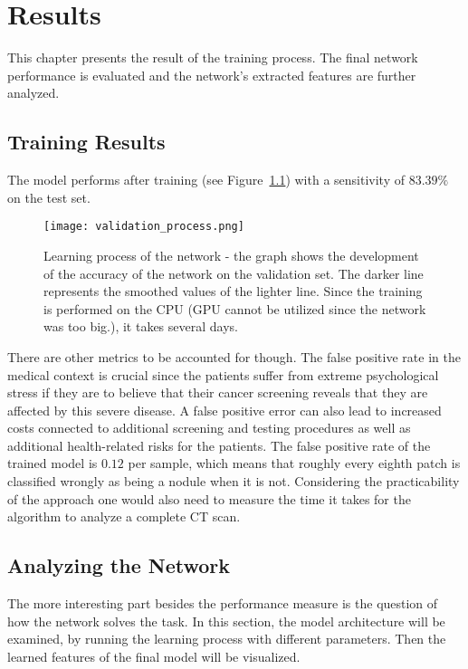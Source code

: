 \documentclass[main.tex]{subfiles}
\begin{document}
\chapter{Results}\label{chap:results}
This chapter presents the result of the training process. The final network performance is evaluated and the network's extracted features are further analyzed.

\section{Training Results}
The model performs after training (see Figure~\ref{fig:validation}) with a sensitivity of $83.39\%$ on the test set.

\begin{figure}[H]
\begin{center}
\texttt{[image: validation\_process.png]}
\end{center}
\caption{Learning process of the network - the graph shows the development of the accuracy of the network on the validation set. The darker line represents the smoothed values of the lighter line. Since the training is performed on the CPU (GPU cannot be utilized since the network was too big.), it takes several days.}
\label{fig:validation}
\end{figure}

There are other metrics to be accounted for though. The false positive rate in the medical context is crucial since the patients suffer from extreme psychological stress if they are to believe that their cancer screening reveals that they are affected by this severe disease. A false positive error can also lead to increased costs connected to additional screening and testing procedures as well as additional health-related risks for the patients. The false positive rate of the trained model is $0.12$ per sample, which means that roughly every eighth patch is classified wrongly as being a nodule when it is not. Considering the practicability of the approach one would also need to measure the time it takes for the algorithm to analyze a complete CT scan.


\section{Analyzing the Network}
The more interesting part besides the performance measure is the question of how the network solves the task. In this section, the model architecture will be examined, by running the learning process with different parameters. Then the learned features of the final model will be visualized.
\end{document}
